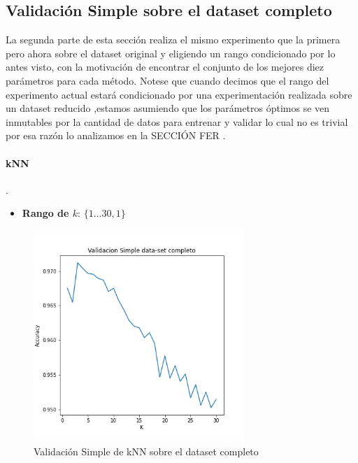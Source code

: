 \subsection{Validación Simple sobre el dataset completo}

La segunda parte de esta sección realiza el mismo experimento que la primera pero ahora sobre el dataset original y eligiendo un rango condicionado por lo antes visto, con la motivación de encontrar el conjunto de los mejores diez parámetros para cada método. Notese que cuando decimos que el rango del experimento actual estará condicionado por una experimentación realizada sobre un dataset reducido ,estamos asumiendo que los parámetros óptimos se ven inmutables por la cantidad de datos para entrenar y validar lo cual no es trivial por esa razón lo analizamos en la SECCIÓN FER .


\paragraph{kNN}
.
\begin{itemize}

    \item \textbf{Rango de $k$}: $\{1\dots30, 1\}$


\end{itemize}

\begin{figure}[H]
    \centering
    \includegraphics[width=8cm]{images/validacionSimple_datasetCompleto.png}%
    \qquad
    \caption{Validación Simple de kNN sobre el dataset completo}
    \label{knn_valSimple}%
\end{figure}

